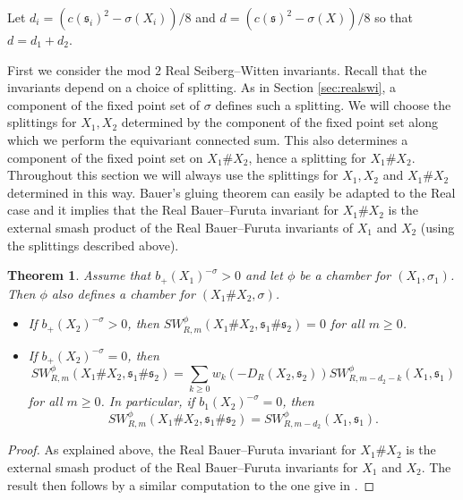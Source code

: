 \documentclass{amsart}
\newtheorem{theorem}{Theorem}[section]
\theoremstyle{definition}
\theoremstyle{remark}
\numberwithin{equation}{section}
\begin{document}
Let $d_i = (c(\mathfrak{s}_i)^2 - \sigma(X_i))/8$ and $d = ( c(\mathfrak{s})^2 - \sigma(X))/8$ so that $d = d_1 + d_2$.

First we consider the mod $2$ Real Seiberg--Witten invariants. Recall that the invariants depend on a choice of splitting. As in Section \ref{sec:realswi}, a component of the fixed point set of $\sigma$ defines such a splitting. We will choose the splittings for $X_1,X_2$ determined by the component of the fixed point set along which we perform the equivariant connected sum. This also determines a component of the fixed point set on $X_1 \# X_2$, hence a splitting for $X_1 \# X_2$. Throughout this section we will always use the splittings for $X_1,X_2$ and $X_1 \# X_2$ determined in this way. Bauer's gluing theorem \cite{b2} can easily be adapted to the Real case and it implies that the Real Bauer--Furuta invariant for $X_1 \# X_2$ is the external smash product of the Real Bauer--Furuta invariants of $X_1$ and $X_2$ (using the splittings described above).

\begin{theorem}\label{thm:mod2glue}
Assume that $b_+(X_1)^{-\sigma} > 0$ and let $\phi$ be a chamber for $(X_1 , \sigma_1)$. Then $\phi$ also defines a chamber for $(X_1 \# X_2 , \sigma )$.
\begin{itemize}
\item[(1)]{If $b_+(X_2)^{-\sigma} > 0$, then $SW^\phi_{R,m}(X_1 \# X_2 , \mathfrak{s}_1 \# \mathfrak{s}_2) = 0$ for all $m \ge 0$.}
\item[(2)]{If $b_+(X_2)^{-\sigma} = 0$, then
\[
SW^\phi_{R,m}(X_1 \# X_2 , \mathfrak{s}_1 \# \mathfrak{s}_2) = \sum_{k \ge 0} w_k( -D_R(X_2,\mathfrak{s}_2) ) SW^\phi_{R,m-d_2-k}(X_1 , \mathfrak{s}_1)
\]
for all $m \ge 0$. In particular, if $b_1(X_2)^{-\sigma} = 0$, then
\[
SW^\phi_{R,m}(X_1 \# X_2 , \mathfrak{s}_1 \# \mathfrak{s}_2) = SW^\phi_{R,m-d_2}(X_1 , \mathfrak{s}_1).
\]
}
\end{itemize}

\end{theorem}
\begin{proof}
As explained above, the Real Bauer--Furuta invariant for $X_1 \# X_2$ is the external smash product of the Real Bauer--Furuta invariants for $X_1$ and $X_2$. The result then follows by a similar computation to the one give in \cite[]{bar2}.
\end{proof}
\end{document}
